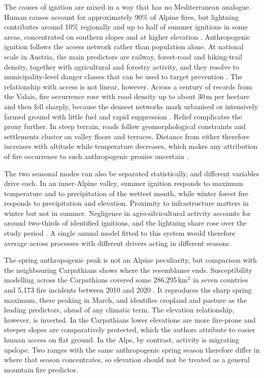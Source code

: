\documentclass[11pt,a4paper]{article}
\begin{document}
The causes of ignition are mixed in a way that has no Mediterranean analogue. Human causes account for approximately 90\% of Alpine fires, but lightning contributes around 10\% regionally and up to half of summer ignitions in some areas, concentrated on southern slopes and at higher elevation \citep{muller_forest_2020, valese_wildfires_2011}. Anthropogenic ignition follows the access network rather than population alone. At national scale in Austria, the main predictors are railway, forest-road and hiking-trail density, together with agricultural and forestry activity, and they resolve to municipality-level danger classes that can be used to target prevention \citep{arndt_modeling_2013}. The relationship with access is not linear, however. Across a century of records from the Valais, fire occurrence rose with road density up to about 30\,m per hectare and then fell sharply, because the densest networks mark urbanised or intensively farmed ground with little fuel and rapid suppression \citep{zumbrunnen_human_2012}. Relief complicates the proxy further. In steep terrain, roads follow geomorphological constraints and settlements cluster on valley floors and terraces. Distance from either therefore increases with altitude while temperature decreases, which makes any attribution of fire occurrence to such anthropogenic proxies uncertain \citep{bekar_crossregional_2020}.

The two seasonal modes can also be separated statistically, and different variables drive each. In an inner-Alpine valley, summer ignition responds to maximum temperature and to precipitation of the wettest month, while winter forest fire responds to precipitation and elevation. Proximity to infrastructure matters in winter but not in summer. Negligence in agro-silvicultural activity accounts for around two-thirds of identified ignitions, and the lightning share rose over the study period \citep{vacchiano_modeling_2018}. A single annual model fitted to this system would therefore average across processes with different drivers acting in different seasons.

The spring anthropogenic peak is not an Alpine peculiarity, but comparison with the neighbouring Carpathians shows where the resemblance ends. Susceptibility modelling across the Carpathians covered some 286{,}295\,km$^2$ in seven countries and 5{,}173 fire incidents between 2010 and 2020 \citep{manczinger_fire_2025}. It reproduces the sharp spring maximum, there peaking in March, and identifies cropland and pasture as the leading predictors, ahead of any climatic term. The elevation relationship, however, is inverted. In the Carpathians lower elevations are more fire-prone and steeper slopes are comparatively protected, which the authors attribute to easier human access on flat ground. In the Alps, by contrast, activity is migrating upslope. Two ranges with the same anthropogenic spring season therefore differ in where that season concentrates, so elevation should not be treated as a general mountain fire predictor.
\end{document}
